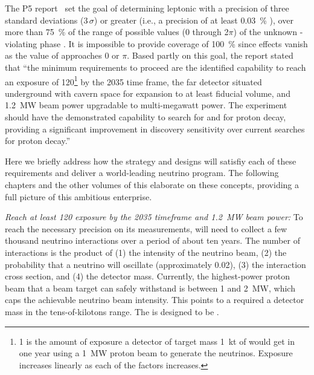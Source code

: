 The P5 report~\cite{p5report} set the goal of 
determining leptonic  with a precision of three standard deviations (\num{3}$\,\sigma$) or greater (i.e., a precision of at least \SI{0.03}{\%} ), over more than \SI{75}{\%}   of the range of possible values  (0 through 2$\pi$) of the unknown -violating phase \deltacp. It is impossible to provide coverage of \SI{100}{\%}  since  effects vanish as the value of \deltacp approaches $0$ or $\pi$. 
 Based partly on this goal, the report stated that ``the 
minimum requirements to proceed are the identified capability to reach an exposure 
of \SI{120}{\ktMWyr}\footnote{\SI{1}{\ktMWyr} is the amount of exposure a detector of target mass \SI{1}{kt} of  would get in one year using a \SI{1}{MW} proton beam to generate the neutrinos. Exposure increases linearly as each of the factors increases.}
 by the 2035 time frame, the far detector situated underground 
with cavern space for expansion to at least \fdfiducialmass {} fiducial volume, and \SI{1.2}{MW} beam power upgradable to multi-megawatt power.
The experiment should have the demonstrated 
capability to search for  and for proton decay, providing a significant 
improvement in discovery sensitivity over current searches for proton decay.'' %


Here we briefly address how the  strategy and designs will satisfiy each of these requirements and deliver a world-leading neutrino program. %
The following chapters and the other volumes of this  elaborate on these concepts, providing a full picture of this ambitious enterprise. 

\textit{Reach at least \SI{120}{\ktMWyr} exposure by the 2035 timeframe and \SI{1.2}{\MW} beam power: } To reach the necessary precision on its measurements,  will need to collect a few thousand neutrino interactions over a period of about ten years. The number of interactions is the product of (1) the intensity of the neutrino beam, (2) the probability that a neutrino will oscillate (approximately \num{0.02}), (3) the interaction cross section, and (4) the detector mass.  Currently, the highest-power proton beam that a beam target can safely withstand is between \num{1} and \SI{2}{\MW}, which caps the achievable neutrino beam intensity. This points to a required a detector mass in the tens-of-kilotons range. The   is designed to be \fdfiducialmass{}.


